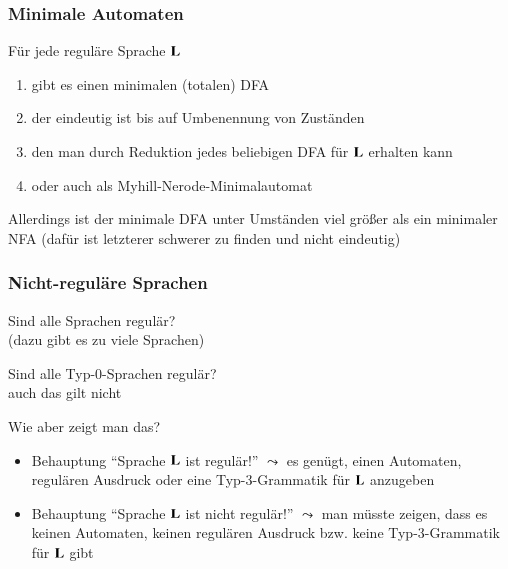 \documentclass[onlymath]{beamer}
\begin{document}
\maketitle


\begin{frame}\frametitle{Minimale Automaten}

Für jede reguläre Sprache $\textbf{\textcolor{black}{L}}$
\begin{enumerate}[\ldots]
\item gibt es einen minimalen (totalen) DFA 
\item der eindeutig ist bis auf Umbenennung von Zuständen
\item den man durch Reduktion jedes beliebigen DFA für $\textbf{\textcolor{black}{L}}$ erhalten kann
\item oder auch als Myhill-Nerode-Minimalautomat
\end{enumerate}
\bigskip

Allerdings ist der minimale DFA unter Umständen viel größer als ein minimaler NFA
(dafür ist letzterer schwerer zu finden und nicht eindeutig)

\end{frame}



\begin{frame}\frametitle{Nicht-reguläre Sprachen}

Sind alle Sprachen regulär?\\
 (dazu gibt es zu viele Sprachen)
\bigskip

Sind alle Typ-0-Sprachen regulär?\\
 auch das gilt nicht
\bigskip

\alert{Wie aber zeigt man das?}
\begin{itemize}
\item Behauptung "`Sprache $\textbf{\textcolor{black}{L}}$ ist regulär!"' $\leadsto$ es genügt, \alert{einen} Automaten, regulären Ausdruck oder eine Typ-3-Grammatik für $\textbf{\textcolor{black}{L}}$ anzugeben
\item Behauptung "`Sprache $\textbf{\textcolor{black}{L}}$ ist nicht regulär!"' $\leadsto$ man müsste zeigen, dass es \alert{keinen} Automaten, \alert{keinen} regulären Ausdruck bzw. \alert{keine} Typ-3-Grammatik für $\textbf{\textcolor{black}{L}}$ gibt
\end{itemize}

\end{frame}
\end{document}
